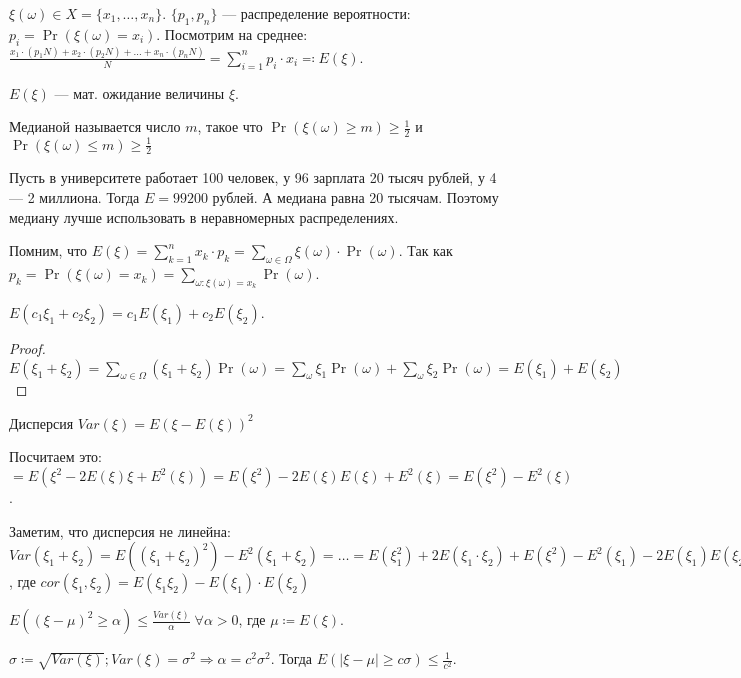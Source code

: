 $\xi(\omega) \in X = \{x_1,\ldots,x_n\}$. $\{p_1,p_n\}$ --- распределение вероятности: $p_i = \Pr(\xi(\omega) = x_i)$. Посмотрим на среднее:  $\frac{x_1\cdot(p_1N) + x_2\cdot(p_2N) + \ldots + x_n \cdot (p_n N)}{N} = \sum_{i=1}^n p_i \cdot x_i \eqqcolon E(\xi)$. 

\begin{definition}
    $E(\xi)$ --- мат. ожидание величины  $\xi$.
\end{definition}
\slashn
\begin{definition}
    Медианой называется число $m$, такое что  $\Pr(\xi(\omega) \ge m) \ge \frac{1}{2}$ и $\Pr(\xi(\omega) \le m) \ge \frac{1}{2}$
\end{definition}
\begin{example}
    Пусть в университете работает 100 человек, у 96 зарплата 20 тысяч рублей, у 4 --- 2 миллиона. Тогда $E = 99200$ рублей. А медиана равна 20 тысячам. Поэтому медиану лучше использовать в неравномерных распределениях. 
\end{example}
\slashn
Помним, что  $E(\xi) = \sum_{k=1}^n x_k \cdot p_k = \sum_{\omega \in \Omega} \xi(\omega) \cdot \Pr(\omega)$. Так как $p_k = \Pr(\xi(\omega) = x_k) = \sum_{\omega: \xi(\omega) = x_k}  \Pr(\omega)$.

\begin{statement}
$E(c_1 \xi_1 + c_2 \xi_2) = c_1E(\xi_1) + c_2E(\xi_2)$.
\end{statement}
\begin{proof}
    $E(\xi_1 + \xi_2) = \sum_{\omega \in \Omega}(\xi_1 + \xi_2) \Pr(\omega) = \sum_{\omega} \xi_1 \Pr(\omega) + \sum_{\omega} \xi_2 \Pr(\omega) = E(\xi_1) + E(\xi_2)$
\end{proof}
\begin{definition}
    Дисперсия $Var(\xi) = E(\xi - E(\xi))^2$
\end{definition}
\slashn
Посчитаем это: $=E(\xi^2 - 2E(\xi)\xi + E^2(\xi)) = E(\xi^2) - 2 E(\xi) E(\xi) + E^2(\xi) = E(\xi^2) - E^2(\xi)$.

Заметим, что дисперсия не линейна: $Var(\xi_1 + \xi_2) = E((\xi_1 + \xi_2)^2) - E^2(\xi_1 + \xi_2) = \ldots = E(\xi_1^2) + 2 E(\xi_1 \cdot \xi_2) + E(\xi^2) - E^2(\xi_1) - 2E(\xi_1) E(\xi_2) -E^2(\xi_2) = Var(\xi_1) + Var(\xi_2) + 2 cor(\xi_1; \xi_2)$, где $cor(\xi_1, \xi_2) = E(\xi_1 \xi_2) - E(\xi_1) \cdot E(\xi_2)$

\begin{theorem}
    $E((\xi - \mu)^2 \ge \alpha) \le \frac{Var(\xi)}{\alpha} \; \forall \alpha>0$, где $\mu \coloneqq E(\xi)$.
\end{theorem}
\begin{consequence}
    $\sigma \coloneqq \sqrt{Var(\xi)}; Var(\xi) = \sigma^2 \Rightarrow \alpha = c^2 \sigma^2$. Тогда  $E(|\xi-\mu| \ge c \sigma) \le \frac{1}{c^2}$.
\end{consequence}
